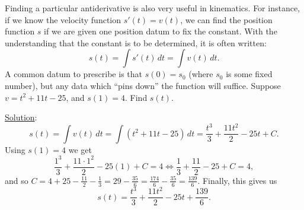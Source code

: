 Finding a particular antiderivative is also very useful
in kinematics.  For instance, if we know the velocity
function $s'(t)=v(t)$, we can find the position function
$s$ if we are given one position datum to fix the constant. 
With the understanding that the constant is to be
determined, it is often written:
\begin{equation}
s(t)=\int s'(t)\,dt=\int v(t)\,dt.
\end{equation}
A common datum to prescribe is that $s(0)=s_0$
(where $s_0$ is some fixed number), but any data
which ``pins down'' the function will suffice.
\bex Suppose $v=t^2+11t-25$, and $s(1)=4$.  Find $s(t)$.

\underline{Solution}:
$$s(t)=\int v(t)\,dt=\int\left(t^2+11t-25\right)\,dt
=\frac{t^3}3+\frac{11t^2}2-25t+C.$$
Using $s(1)=4$ we get
$$\frac{1^3}3+\frac{11\cdot1^2}2-25(1)+C=4
\iff \frac13+\frac{11}2-25+C=4,$$
and so $C=4+25-\frac{11}2-\frac13=29-\frac{35}6=\frac{174}6-\frac{35}6
=\frac{139}6.$  Finally, this gives us
$$s(t)=\frac{t^3}3+\frac{11t^2}2-25t+\frac{139}6.$$
\eex

